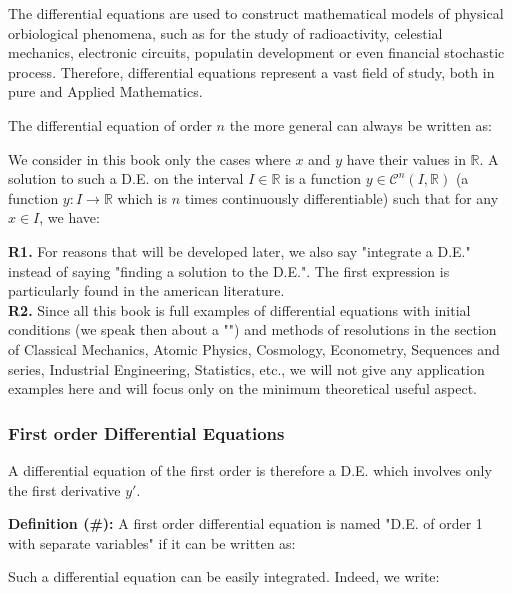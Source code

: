 	\begin{tcolorbox}[title=Remark,colframe=black,arc=10pt]
	The differential equations are used to construct mathematical models of physical orbiological phenomena, such as for the study of radioactivity, celestial mechanics, electronic circuits, populatin development or even financial stochastic process. Therefore, differential equations represent a vast field of study, both in pure and Applied Mathematics.
	\end{tcolorbox}
	The differential equation of order $n$ the more general can always be written as:
	
	We consider in this book only the cases where $x$ and $y$ have their values in $\mathbb{R}$. A solution to such a D.E. on the interval $I \in \mathbb{R}$ is a function $y \in \mathcal{C}^n (I,\mathbb{R})$ (a function $y:I \rightarrow \mathbb{R}$ which is $n$ times continuously differentiable) such that for any $x \in I$, we have:
	
	\begin{tcolorbox}[title=Remarks,colframe=black,arc=10pt]
	\textbf{R1.} For reasons that will be developed later, we also say "integrate a D.E." instead of saying "finding a solution to the D.E.". The first expression is particularly found in the american literature.\\
	
	\textbf{R2.} Since all this book is full examples of differential equations with initial conditions (we speak then about a "") and methods of resolutions in the section of Classical Mechanics, Atomic Physics, Cosmology, Econometry, Sequences and series, Industrial Engineering, Statistics, etc., we will not give any application examples here and will focus only on the minimum theoretical useful aspect.
	\end{tcolorbox}
	
	\pagebreak
	\subsubsection{First order Differential Equations}
	A differential equation of the first order is therefore a D.E. which involves only the first derivative $y'$.
	
	\textbf{Definition (\#\mydef):} A first order differential equation is named "D.E. of order 1 with separate variables" if it can be written as:
	
	Such a differential equation can be easily integrated. Indeed, we write:
	
